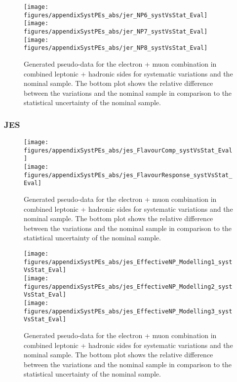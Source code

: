 \begin{figure}[!hb]
\begin{center}
        \texttt{[image: figures/appendixSystPEs\_abs/jer\_NP6\_systVsStat\_Eval]}\\
        \texttt{[image: figures/appendixSystPEs\_abs/jer\_NP7\_systVsStat\_Eval]}\\
        \texttt{[image: figures/appendixSystPEs\_abs/jer\_NP8\_systVsStat\_Eval]}\\
\caption{Generated pseudo-data for the electron + muon combination in combined leptonic + hadronic sides for systematic variations and the nominal \ttbar sample. The bottom plot shows the relative difference between the variations and the nominal sample in comparison to the statistical uncertainty of the nominal sample.}   
\label{fig:systematicVar_lephad_JER_1_4}
\end{center}
\end{figure}


\subsubsection{JES}

\begin{figure}[!hb]
\begin{center}
        \texttt{[image: figures/appendixSystPEs\_abs/jes\_FlavourComp\_systVsStat\_Eval]}\\
        \texttt{[image: figures/appendixSystPEs\_abs/jes\_FlavourResponse\_systVsStat\_Eval]}\\
\caption{Generated pseudo-data for the electron + muon combination in combined leptonic + hadronic sides for systematic variations and the nominal \ttbar sample. The bottom plot shows the relative difference between the variations and the nominal sample in comparison to the statistical uncertainty of the nominal sample.}   
\label{fig:systematicVar_lephad_JES_1_1}
\end{center}
\end{figure}

\begin{figure}[!hb]
\begin{center}
        \texttt{[image: figures/appendixSystPEs\_abs/jes\_EffectiveNP\_Modelling1\_systVsStat\_Eval]}\\
        \texttt{[image: figures/appendixSystPEs\_abs/jes\_EffectiveNP\_Modelling2\_systVsStat\_Eval]}\\
        \texttt{[image: figures/appendixSystPEs\_abs/jes\_EffectiveNP\_Modelling3\_systVsStat\_Eval]}
\caption{Generated pseudo-data for the electron + muon combination in combined leptonic + hadronic sides for systematic variations and the nominal \ttbar sample. The bottom plot shows the relative difference between the variations and the nominal sample in comparison to the statistical uncertainty of the nominal sample.}   
\label{fig:systematicVar_lephad_JES_1_2}
\end{center}
\end{figure}
        
